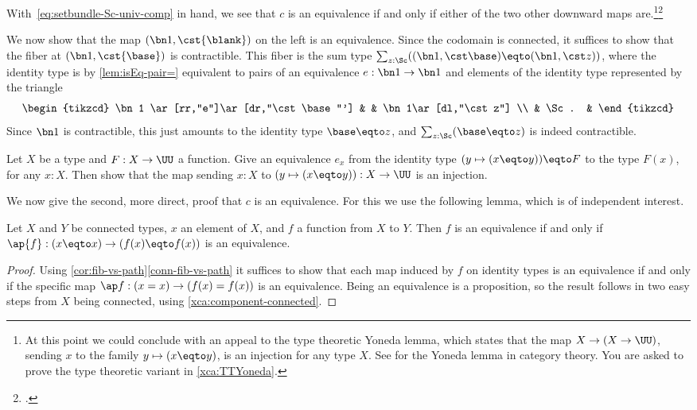 With~\eqref{eq:setbundle-Sc-univ-comp} in hand, we see that $c$ is an equivalence
if and only if either of the two other downward maps are.\footnote{%
  At this point we could conclude with an appeal to the type theoretic 
  Yoneda lemma, which states that the map $X \to (X \to \UU)$,
  sending $x$ to the family $y \mapsto (x\eqto y)$,
  is an injection for any type $X$.
  See \footnotemark{} for the Yoneda lemma in category theory.
  You are asked to prove the type theoretic variant in
  \cref{xca:TTYoneda}.}\footcitetext{RiehlContext}
  
We now show that the map $(\bn 1,\cst{\blank})$ 
on the left is an equivalence. Since the codomain is connected,
it suffices to show that the fiber at $(\bn 1,\cst{\base})$ is contractible. 
This fiber is the sum type $\sum_{z:\Sc}((\bn 1,\cst \base)\eqto(\bn 1,\cst z))$,
where the identity type is by \cref{lem:isEq-pair=} equivalent to pairs of 
an equivalence $e : \bn 1 \to \bn 1$ and elements of the identity type
represented by the triangle
\[
  \begin{tikzcd}
    \bn 1 \ar[rr,"e"]\ar[dr,"\cst \base"'] & & \bn 1\ar[dl,"\cst z"] \\
    & \Sc. &
  \end{tikzcd}
\]
Since $\bn 1$ is contractible, this just amounts to the identity type
$\base\eqto z$, and $\sum_{z:\Sc}(\base\eqto z)$ is indeed contractible.

\begin{xca}\label{xca:TTYoneda}
Let $X$ be a type and $F: X\to\UU$ a function. Give an equivalence
$e_x$ from the identity type $(y \mapsto (x\eqto y)) \eqto F$
to the type $F(x)$, for any $x:X$. Then show that the map sending
$x:X$ to $(y \mapsto (x\eqto y)) : X\to\UU$
is an injection.
\end{xca}

We now give the second, more direct, proof that $c$ is an equivalence.
For this we use the following lemma, which is of independent interest.
\begin{lemma}\label{lem:conn-eq-f-ap-f-x}
Let $X$ and $Y$ be connected types, $x$ an element of $X$,
and $f$ a function from $X$ to $Y$. Then $f$ is an equivalence
if and only if $\ap{f}: (x\eqto x) \to (f(x)\eqto f(x))$ is an equivalence.
\end{lemma}
\begin{proof}
Using \cref{cor:fib-vs-path}\ref{conn-fib-vs-path} it suffices to show that
each map induced by $f$ on identity types is an equivalence if and only if the specific map
$\ap f : (x=x) \to (f(x) = f(x))$ is an equivalence.  Being an equivalence is a proposition,
so the result follows in two easy steps from $X$ being connected,
using \cref{xca:component-connected}.
\end{proof}

